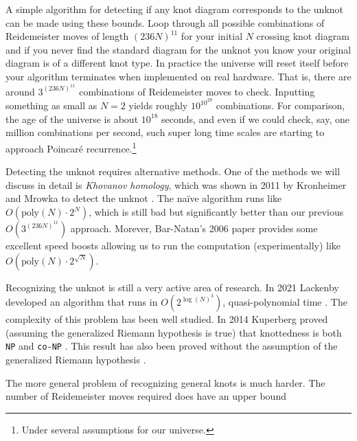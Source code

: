     A simple algorithm for detecting if any knot diagram corresponds to the
    unknot can be made using these bounds. Loop through all possible
    combinations of Reidemeister moves of length $(236N)^{11}$ for your
    initial $N$ crossing knot diagram and if you never
    find the standard diagram for the unknot you know your original diagram
    is of a different knot type. In practice the universe will reset itself
    before your algorithm terminates when implemented on real hardware. That is,
    there are around $3^{(236N)^{11}}$ combinations of Reidemeister moves to
    check. Inputting something as small as $N=2$ yields roughly
    $10^{10^{29}}$ combinations. For comparison, the age of the universe is
    about $10^{18}$ seconds, and even if we could check, say, one million
    combinations per second, such super long time scales are starting to
    approach Poincar\'{e} recurrence.\footnote{%
        Under several assumptions for our universe.
    }
    \par\hfill\par
    Detecting the unknot requires alternative methods. One of the methods we
    will discuss in detail is \textit{Khovanov homology}, which was shown in
    2011 by Kronheimer and Mrowka to detect the unknot
    \cite{KronheimerMrowka2011KhovanovUnknot}. The na\"{i}ve algorithm runs
    like $O(\textrm{poly}(N)\cdot{2}^{N})$, which is still bad but
    significantly better than our previous $O(3^{(236N)^{11}})$ approach.
    Morever, Bar-Natan's 2006 paper provides some excellent speed boosts
    \cite{BarNatan2006FASTKH} allowing us to run the computation
    (experimentally) like $O(\textrm{poly}(N)\cdot{2}^{\sqrt{N}})$.
    \par\hfill\par
    Recognizing the unknot is still a very active area of research. In 2021
    Lackenby developed an algorithm that runs in
    $O(2^{\log(N)^{3}})$, quasi-polynomial time
    \cite{LackenBy2021QuasiPolyUnknotting}. The complexity of this problem
    has been well studied. In 2014 Kuperberg proved (assuming the generalized
    Riemann hypothesis is true) that knottedness is both \texttt{NP} and
    \texttt{co-NP} \cite{Kuperberg2014KnottednessNP}. This result has also been
    proved without the assumption of the generalized Riemann hypothesis
    \cite{Lackenby2021UnknotNP}.
    \par\hfill\par
    The more general problem of recognizing general knots is much harder.
    The number of Reidemeister moves required does have an upper bound
